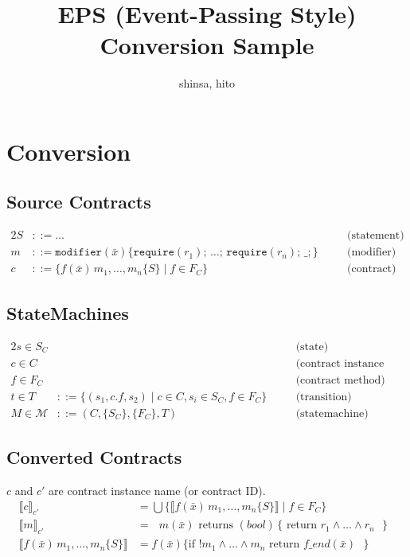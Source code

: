 \documentclass[11pt]{jsarticle}
\title{EPS (Event-Passing Style) Conversion Sample}
\author{shinsa, hito}
\begin{document}
\maketitle
\section{Conversion}
\subsection{Source Contracts}
\begin{alignat}{2}
S  & ::= \dots && \quad\text{(statement)} \\
m  & ::= \texttt{modifier}(\bar{x}) \{ \texttt{require}(r_1);\, \dots;\, \texttt{require}(r_n);\, \_; \} & &\quad\text{(modifier)} \\
c  & ::= \{ f(\mathit{\bar{x}}) \, m_1, \dots, m_n \{S\} \mid f \in F_C \}  & & \quad\text{(contract)} 
\end{alignat}
\subsection{StateMachines}
\begin{alignat}{2}
s \in S_C & && \quad\text{(state)} \\
c \in C &&& \quad\text{(contract instance name)}\\ 
f \in F_C &&& \quad\text{(contract method)}\\
t \in T & ::= \{ (s_1, c.f, s_2) \mid c \in C, s_i \in S_C, f \in F_C \} &&\quad\text{(transition)} \\
M \in \mathcal{M} & ::= (C, \{ S_C \}, \{F_C\},  T)  & & \quad\text{(statemachine)} 
\end{alignat}
\subsection{Converted Contracts}
$c$ and $c'$ are contract instance name (or contract ID).
\begin{align}
\llbracket c \rrbracket_{c'} &= \bigcup \{ \llbracket f (\mathit{\bar{x}}) \, m_1, \dots, m_n \{S\} \rrbracket \mid f \in F_C \} \\
\llbracket m \rrbracket_{c'} &= \text{ $m(\bar{x})$ returns $(\mathit{bool})\,\{$  return $r_1 \land \dots \land r_n$ $\}$ } \\
\llbracket f (\mathit{\bar{x}}) \, m_1, \dots, m_n \{S\} \rrbracket &= f (\mathit{\bar{x}}) \{ \text{if !$m_1 \land \dots \land m_n$ return $\mathit{f\_end}(\bar x)$ } \} 
\end{align}
\end{document}
